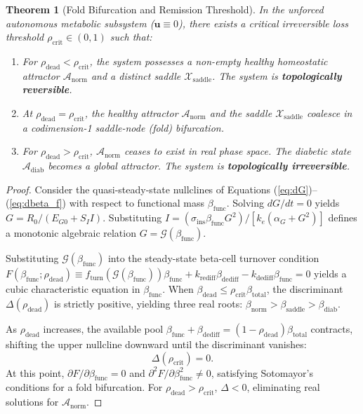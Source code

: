 \documentclass[11pt,a4paper]{article}
\newtheorem{theorem}{Theorem}[section]
\begin{document}
\begin{theorem}[Fold Bifurcation and Remission Threshold]
In the unforced autonomous metabolic subsystem ($\bm{u} \equiv 0$), there exists a critical irreversible loss threshold $\rho_{\mathrm{crit}} \in (0, 1)$ such that:
\begin{enumerate}
    \item For $\rho_{\mathrm{dead}} < \rho_{\mathrm{crit}}$, the system possesses a non-empty healthy homeostatic attractor $\mathcal{A}_{\mathrm{norm}}$ and a distinct saddle $\mathcal{X}_{\mathrm{saddle}}$. The system is \textbf{topologically reversible}.
    \item At $\rho_{\mathrm{dead}} = \rho_{\mathrm{crit}}$, the healthy attractor $\mathcal{A}_{\mathrm{norm}}$ and the saddle $\mathcal{X}_{\mathrm{saddle}}$ coalesce in a codimension-1 saddle-node (fold) bifurcation.
    \item For $\rho_{\mathrm{dead}} > \rho_{\mathrm{crit}}$, $\mathcal{A}_{\mathrm{norm}}$ ceases to exist in real phase space. The diabetic state $\mathcal{A}_{\mathrm{diab}}$ becomes a global attractor. The system is \textbf{topologically irreversible}.
\end{enumerate}
\end{theorem}

\begin{proof}
Consider the quasi-steady-state nullclines of Equations (\ref{eq:dG})--(\ref{eq:dbeta_f}) with respect to functional mass $\beta_{\mathrm{func}}$. Solving $dG/dt = 0$ yields $G = R_0 / (E_{G0} + S_I I)$. Substituting $I = (\sigma_{\mathrm{ins}} \beta_{\mathrm{func}} G^2) / [k_e(\alpha_G + G^2)]$ defines a monotonic algebraic relation $G = \mathcal{G}(\beta_{\mathrm{func}})$. 

Substituting $\mathcal{G}(\beta_{\mathrm{func}})$ into the steady-state beta-cell turnover condition $F(\beta_{\mathrm{func}}; \rho_{\mathrm{dead}}) \equiv f_{\mathrm{turn}}(\mathcal{G}(\beta_{\mathrm{func}})) \beta_{\mathrm{func}} + k_{\mathrm{rediff}} \beta_{\mathrm{dediff}} - k_{\mathrm{dediff}} \beta_{\mathrm{func}} = 0$ yields a cubic characteristic equation in $\beta_{\mathrm{func}}$. When $\beta_{\mathrm{dead}} \le \rho_{\mathrm{crit}} \beta_{\mathrm{total}}$, the discriminant $\Delta(\rho_{\mathrm{dead}})$ is strictly positive, yielding three real roots: $\beta_{\mathrm{norm}} > \beta_{\mathrm{saddle}} > \beta_{\mathrm{diab}}$. 

As $\rho_{\mathrm{dead}}$ increases, the available pool $\beta_{\mathrm{func}} + \beta_{\mathrm{dediff}} = (1 - \rho_{\mathrm{dead}})\beta_{\mathrm{total}}$ contracts, shifting the upper nullcline downward until the discriminant vanishes:
\begin{equation}
\Delta(\rho_{\mathrm{crit}}) = 0.
\end{equation}
At this point, $\partial F / \partial \beta_{\mathrm{func}} = 0$ and $\partial^2 F / \partial \beta_{\mathrm{func}}^2 \neq 0$, satisfying Sotomayor's conditions for a fold bifurcation. For $\rho_{\mathrm{dead}} > \rho_{\mathrm{crit}}$, $\Delta < 0$, eliminating real solutions for $\mathcal{A}_{\mathrm{norm}}$.
\end{proof}
\end{document}
